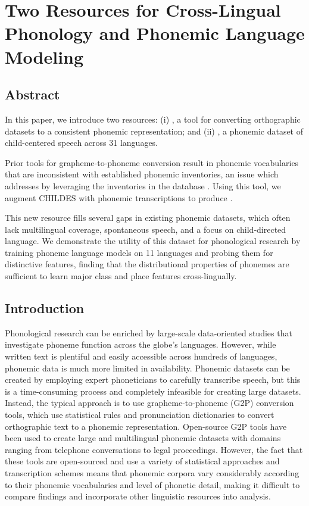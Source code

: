 \chapter{Two Resources for Cross-Lingual Phonology and Phonemic Language Modeling}\label{chapter:resources}
\section{Abstract}

In this paper, we introduce two resources: (i) \gpp, a tool for converting orthographic datasets to a consistent phonemic representation; and (ii) \ipachildes, a phonemic dataset of child-centered speech across 31 languages. 

Prior tools for grapheme-to-phoneme conversion result in phonemic vocabularies that are inconsistent with established phonemic inventories, an issue which \gpp addresses by leveraging the inventories in the \phoible database \citep{phoible}. 
Using this tool, we augment CHILDES \citep{macwhinney1985child} with phonemic transcriptions to produce \ipachildes.

This new resource fills several gaps in existing phonemic datasets, which often lack multilingual coverage, spontaneous speech, and a focus on child-directed language.
We demonstrate the utility of this dataset for phonological research by training phoneme language models on 11 languages and probing them for distinctive features, finding that the distributional properties of phonemes are sufficient to learn major class and place features cross-lingually.

\section{Introduction}

Phonological research can be enriched by large-scale data-oriented studies that investigate phoneme function across the globe's languages. However, while written text is plentiful and easily accessible across hundreds of languages, phonemic data is much more limited in availability. Phonemic datasets can be created by employing expert phoneticians to carefully transcribe speech, but this is a time-consuming process and completely infeasible for creating large datasets. Instead, the typical approach is to use grapheme-to-phoneme (G2P) conversion tools, which use statistical rules and pronunciation dictionaries to convert orthographic text to a phonemic representation. Open-source G2P tools have been used to create large and multilingual phonemic datasets with domains ranging from telephone conversations to legal proceedings. However, the fact that these tools are open-sourced and use a variety of statistical approaches and transcription schemes means that phonemic corpora vary considerably according to their phonemic vocabularies and level of phonetic detail, making it difficult to compare findings and incorporate other linguistic resources into analysis.

